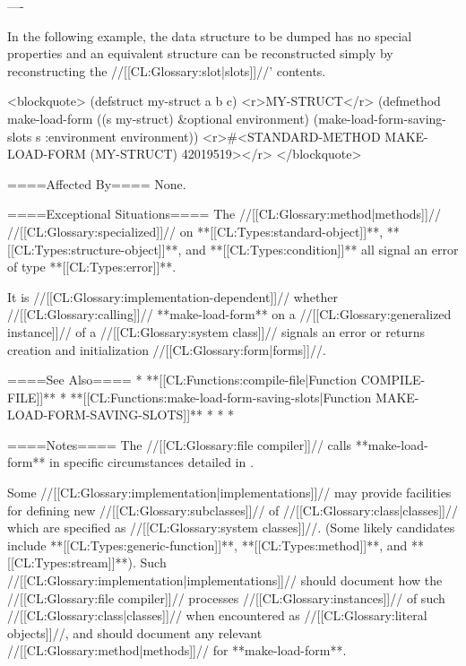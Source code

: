 ----

In the following example, the data structure to be dumped has no special properties and an equivalent structure can be reconstructed simply by reconstructing the //[[CL:Glossary:slot|slots]]//' contents.

<blockquote>
(defstruct my-struct a b c) <r>MY-STRUCT</r>
(defmethod make-load-form ((s my-struct) &optional environment) 
  (make-load-form-saving-slots s :environment environment))
<r>#<STANDARD-METHOD MAKE-LOAD-FORM (MY-STRUCT) 42019519></r>
</blockquote>

====Affected By====
None.

====Exceptional Situations====
The //[[CL:Glossary:method|methods]]// //[[CL:Glossary:specialized]]// on **[[CL:Types:standard-object]]**, **[[CL:Types:structure-object]]**, and **[[CL:Types:condition]]** all signal an error of type **[[CL:Types:error]]**.

It is //[[CL:Glossary:implementation-dependent]]// whether //[[CL:Glossary:calling]]// **make-load-form** on a //[[CL:Glossary:generalized instance]]// of a //[[CL:Glossary:system class]]// signals an error or returns creation and initialization //[[CL:Glossary:form|forms]]//.

====See Also====
  * **[[CL:Functions:compile-file|Function COMPILE-FILE]]**
  * **[[CL:Functions:make-load-form-saving-slots|Function MAKE-LOAD-FORM-SAVING-SLOTS]]**
  * {\secref\CallingMakeLoadForm}
  * {\secref\Evaluation}
  * {\secref\Compilation}

====Notes====
The //[[CL:Glossary:file compiler]]// calls **make-load-form** in specific circumstances detailed in \secref\CallingMakeLoadForm.

Some //[[CL:Glossary:implementation|implementations]]// may provide facilities for defining new //[[CL:Glossary:subclasses]]// of //[[CL:Glossary:class|classes]]// which are specified as //[[CL:Glossary:system classes]]//. (Some likely candidates include **[[CL:Types:generic-function]]**, **[[CL:Types:method]]**, and **[[CL:Types:stream]]**). Such //[[CL:Glossary:implementation|implementations]]// should document how the //[[CL:Glossary:file compiler]]// processes //[[CL:Glossary:instances]]// of such //[[CL:Glossary:class|classes]]// when encountered as //[[CL:Glossary:literal objects]]//, and should document any relevant //[[CL:Glossary:method|methods]]// for **make-load-form**.

 
